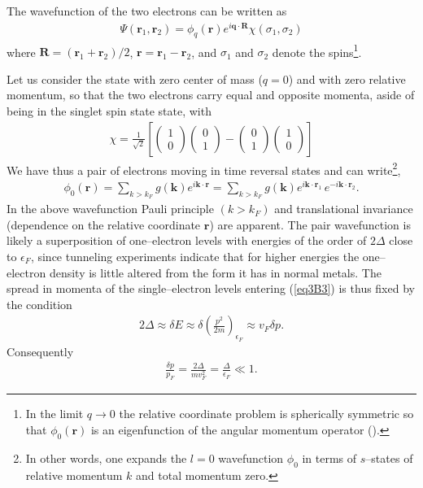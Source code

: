 \begin{subappendices}
The wavefunction of the two electrons can be written as
\begin{align}\label{eq3B1}
\Psi(\mathbf r_1,\mathbf r_2)=\phi_q(\mathbf r)e^{i\mathbf q\cdot\mathbf R}\chi(\sigma_1,\sigma_2)
\end{align}
where $\mathbf R=(\mathbf r_1+\mathbf r_2)/2$, $\mathbf r=\mathbf r_1-\mathbf r_2$, and $\sigma_1$ and $\sigma_2$ denote the spins\footnote{In the limit $q\rightarrow 0$ the relative coordinate problem is spherically symmetric so that $\phi_0(\mathbf r)$ is an eigenfunction of the angular momentum operator (\cite{Schrieffer:64}).}. 


Let us consider the state with zero center of mass ($q=0$) and with zero relative  momentum, so that the two electrons carry  equal and opposite momenta, aside of being in the singlet spin state state, with
\begin{align}\label{eq3B2}
\chi=\frac{1}{\sqrt{2}}\left[
\left(\begin{array}{c}
1\\ 
0
\end{array} \right)
\left(\begin{array}{c}
0\\ 
1
\end{array} \right)-
\left(\begin{array}{c}
0\\ 
1
\end{array} \right)
\left(\begin{array}{c}
1\\ 
0
\end{array} \right)
\right]
\end{align}
 We have thus a pair of electrons moving in time reversal states and can write\footnote{In other words, one expands the $l=0$ wavefunction $\phi_0$ in terms of $s$--states of relative momentum $k$ and total momentum zero.},
\begin{align}\label{eq3B3}
\phi_0(\mathbf r)=\sum_{k>k_F}g(\mathbf k)e^{i\mathbf k\cdot\mathbf r}=\sum_{k>k_F}g(\mathbf k)e^{i\mathbf k\cdot\mathbf r_1}\,e^{-i\mathbf k\cdot\mathbf r_2}.
\end{align}
In the above wavefunction Pauli principle $(k>k_F)$ and translational invariance (dependence on the relative coordinate $\mathbf r$) are apparent. The pair wavefunction is likely a superposition of one--electron levels with energies of the order of $2\Delta$ close to $\epsilon_F$, since tunneling experiments indicate that for higher energies the one--electron density is little altered from the form it has in normal metals. The spread in momenta of the single--electron levels entering (\ref{eq3B3}) is thus fixed by the condition 
\begin{align}\label{eq3B4}
2\Delta\approx\delta E\approx\delta \left(\frac{p^2}{2m}\right)_{\epsilon_F}\approx v_F\delta p.
\end{align}
Consequently
\begin{align}\label{eq3B5}
\frac{\delta p}{p_F}=\frac{2\Delta}{mv_F^2}=\frac{\Delta}{\epsilon_F}\ll1.
\end{align}


\end{subappendices}
